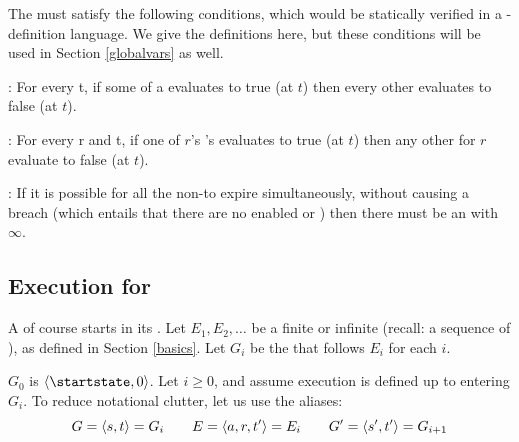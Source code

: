 \documentclass[12pt]{article}
\begin{document}
The \TGuards must satisfy the following conditions, which would be statically verified in a \Contract-definition language. We give the \FSContracts definitions here, but these conditions will be used in Section \ref{globalvars} as well.
\medskip

\noindent {}: For every \TimeStamp t, if some \TGuard of a \mustntran evaluates to true (at $t$) then every other \TGuard evaluates to false (at $t$).
\medskip

\noindent {}: For every \Role r and \TimeStamp t, if one of $r$'s \rmustntrans's \TGuards evaluates to true (at $t$) then any other \rmustntrans for $r$ evaluate to false (at $t$).
\medskip

\noindent {}: If it is possible for all the \enabled non-\Env \transitions to expire simultaneously, without causing a breach (which entails that there are no enabled \mustntrans or \rmustntrans) then there must be an \depTrans{\Env} with \Deadline $\infty$.
\smallskip



%


\subsection{Execution for \FSContracts} \label{fscontractexec}
A \FSContract of course starts in its \startstate. Let $E_1, E_2, \dots$ be a finite or infinite \trace (recall: a sequence of \Events), as defined in Section \ref{basics}. Let $G_i$ be the \GlobalState that follows $E_i$ for each $i$.

$G_0$ is $\tup{\startstate, 0}$.
Let $i \geq 0$, and assume execution is defined up to entering $G_i$. To reduce notational clutter, let us use the aliases:
\[ G = \langle s,t\rangle = G_i  \qquad E = \langle a,r,t'\rangle = E_i \qquad  G' = \langle s',t'\rangle = G_{i+1}\]
\end{document}
